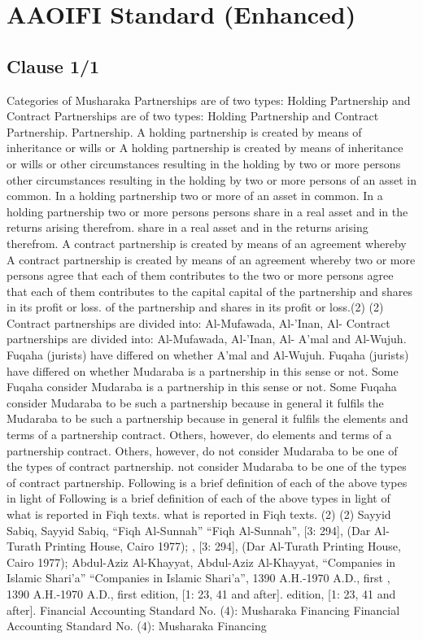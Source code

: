\documentclass{article}%
\begin{document}
%
\normalsize%
\section{AAOIFI Standard (Enhanced)}%
\label{sec:AAOIFIStandard(Enhanced)}%
\subsection{Clause 1/1}%
\label{subsec:Clause1/1}%
Categories of Musharaka   Partnerships are of two types: Holding Partnership and Contract    Partnerships are of two types: Holding Partnership and Contract  Partnership. Partnership.   A holding partnership is created by means of inheritance or wills or    A holding partnership is created by means of inheritance or wills or  other circumstances resulting in the holding by two or more persons  other circumstances resulting in the holding by two or more persons  of an asset in common. In a holding partnership two or more  of an asset in common. In a holding partnership two or more persons  persons  share in a real asset and in the returns arising therefrom. share in a real asset and in the returns arising therefrom.   A contract partnership is created by means of an agreement whereby    A contract partnership is created by means of an agreement whereby  two or more persons agree that each of them contributes to the  two or more persons agree that each of them contributes to the capital  capital  of the partnership and shares in its profit or loss. of the partnership and shares in its profit or loss.(2) (2)   Contract partnerships are divided into: Al-Mufawada, Al-’Inan, Al-   Contract partnerships are divided into: Al-Mufawada, Al-’Inan, Al- A’mal and Al-Wujuh. Fuqaha (jurists) have differed on whether  A’mal and Al-Wujuh. Fuqaha (jurists) have differed on whether  Mudaraba is a partnership in this sense or not. Some Fuqaha consider  Mudaraba is a partnership in this sense or not. Some Fuqaha consider  Mudaraba to be such a partnership because in general it fulfils the  Mudaraba to be such a partnership because in general it fulfils the  elements and terms of a partnership contract. Others, however, do  elements and terms of a partnership contract. Others, however, do  not consider Mudaraba to be one of the types of contract partnership. not consider Mudaraba to be one of the types of contract partnership.   Following is a brief definition of each of the above types in light of    Following is a brief definition of each of the above types in light of  what is reported in Fiqh texts. what is reported in Fiqh texts. (2) (2) Sayyid Sabiq,   Sayyid Sabiq, “Fiqh Al-Sunnah” “Fiqh Al-Sunnah”, [3: 294], (Dar Al-Turath Printing House, Cairo 1977);  , [3: 294], (Dar Al-Turath Printing House, Cairo 1977);  Abdul-Aziz Al-Khayyat,  Abdul-Aziz Al-Khayyat, “Companies in Islamic Shari’a” “Companies in Islamic Shari’a”, 1390 A.H.-1970 A.D., first  , 1390 A.H.-1970 A.D., first  edition, [1: 23, 41 and after].  edition, [1: 23, 41 and after].  Financial Accounting Standard No. (4): Musharaka Financing Financial Accounting Standard No. (4): Musharaka Financing
\end{document}
